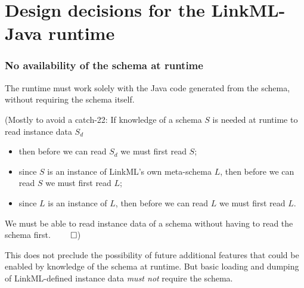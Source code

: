 \section{Design decisions for the LinkML-Java runtime}

\begin{frame}
  \frametitle{No availability of the schema at runtime}

  \begin{block}{}
    The runtime must work solely with the Java code generated from the
    schema, without requiring the schema itself.
  \end{block}

  \bigskip
  {\scriptsize
  (Mostly to avoid a catch-22: If knowledge of a schema $S$ is needed
  at runtime to read instance data $S_d$

  \begin{itemize}
    \item then before we can read $S_d$ we must first read $S$;
    \item since $S$ is an instance of LinkML's own meta-schema $L$,
      then before we can read $S$ we must first read $L$;
    \item since $L$ is an instance of $L$, then before we can read $L$
      we must first read $L$.
  \end{itemize}

  \rightarrow\hspace{.5em} We must be able to read instance data of a
  schema without having to read the schema first. $\qed$)}

  \bigskip
  This does not preclude the possibility of future additional features
  that could be enabled by knowledge of the schema at runtime. But basic
  loading and dumping of LinkML-defined instance data \emph{must not}
  require the schema.

\end{frame}

